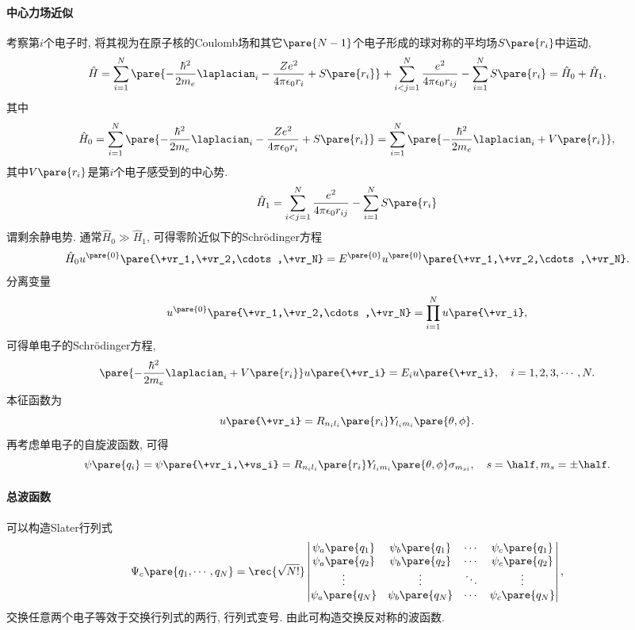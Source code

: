\documentclass[hidelinks]{ctexart}
\begin{document}
\paragraph{中心力场近似} %
\label{par:中心力场近似}

考察第$i$个电子时, 将其视为在原子核的Coulomb场和其它$\pare{N-1}$个电子形成的球对称的平均场$S\pare{r_i}$中运动,
\[ \hat H = \sum_{i=1}^N \pare{-\frac{\hbar^2}{2m_e}\laplacian_i - \frac{Ze^2}{4\pi\epsilon_0 r_i} + S\pare{r_i}} + \sum_{i<j = 1}^N \frac{e^2}{4\pi\epsilon_0 r_{ij}} - \sum_{i=1}^N S\pare{r_i} = \hat H_0 + \hat H_1. \]
其中
\[ \hat H_0 = \sum_{i=1}^N \pare{-\frac{\hbar^2}{2m_e}\laplacian_i - \frac{Ze^2}{4\pi\epsilon_0 r_i} + S\pare{r_i}} = \sum_{i=1}^N \pare{-\frac{\hbar^2}{2m_e}\laplacian_i + V\pare{r_i}}, \]
其中$V\pare{r_i}$是第$i$个电子感受到的中心势.
\[ \hat H_1 = \sum_{i<j = 1}^N \frac{e^2}{4\pi\epsilon_0 r_{ij}} - \sum_{i=1}^N S\pare{r_i} \]
谓剩余静电势. 通常$\hat H_0 \gg \hat H_1$, 可得零阶近似下的Schr\"odinger方程
\[ \hat H_0 u^{\pare{0}}\pare{\+vr_1,\+vr_2,\cdots,\+vr_N} = E^{\pare{0}}u^{\pare{0}}\pare{\+vr_1,\+vr_2,\cdots,\+vr_N}. \]
分离变量
\[ u^{\pare{0}}\pare{\+vr_1,\+vr_2,\cdots,\+vr_N} = \prod_{i=1}^N u\pare{\+vr_i}, \]
可得单电子的Schr\"odinger方程,
\[ \pare{-\frac{\hbar^2}{2m_e}\laplacian_i + V\pare{r_i}}u\pare{\+vr_i} = E_i u\pare{\+vr_i},\quad i = 1,2,3,\cdots,N. \]
本征函数为
\[ u\pare{\+vr_i} = R_{n_il_i}\pare{r_i} Y_{l_im_i}\pare{\theta,\phi}. \]
再考虑单电子的自旋波函数, 可得
\[ \psi\pare{q_i} = \psi\pare{\+vr_i,\+vs_i} = R_{n_il_i}\pare{r_i}Y_{l_im_i}\pare{\theta,\phi}\sigma_{m_{si}},\quad s = \half, m_s = \pm \half. \]


\paragraph{总波函数} %
\label{par:总波函数}

可以构造Slater行列式
\[ \Psi_c\pare{q_1,\cdots,q_N} = \rec{\sqrt{N!}} \begin{vmatrix}
    \psi_a\pare{q_1} & \psi_b\pare{q_1} & \cdots & \psi_c\pare{q_1} \\
    \psi_a\pare{q_2} & \psi_b\pare{q_2} & \cdots & \psi_c\pare{q_2} \\
    \vdots & \vdots & \ddots & \vdots \\
    \psi_a\pare{q_N} & \psi_b\pare{q_N} & \cdots & \psi_c\pare{q_N}
\end{vmatrix}, \]
交换任意两个电子等效于交换行列式的两行, 行列式变号. 由此可构造交换反对称的波函数.
\end{document}
